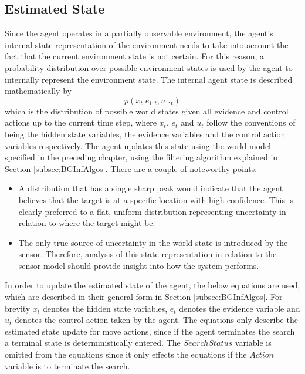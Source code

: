 \subsection{Estimated State}
\workinprogress
Since the agent operates in a partially observable environment, the agent's internal state representation of the environment needs to take into account the fact that the current environment state is not certain. For this reason, a probability distribution over possible environment states is used by the agent to internally represent the environment state. The internal agent state is described mathematically by 
\[p(x_t | e_{1:t}, u_{1:t})\]
which is the distribution of possible world states given all evidence and control actions up to the current time step, where $x_t$, $e_t$ and $u_t$ follow the conventions of being the hidden state variables, the evidence variables and the control action variables respectively. The agent updates this state using the world model specified in the preceding chapter, using the filtering algorithm explained in Section \ref{subsec:BGInfAlgos}. There are a couple of noteworthy points:
\begin{itemize}
    \item A distribution that has a single sharp peak would indicate that the agent believes that the target is at a specific location with high confidence. This is clearly preferred to a flat, uniform distribution representing uncertainty in relation to where the target might be.
    \item The only true source of uncertainty in the world state is introduced by the sensor. Therefore, analysis of this state representation in relation to the sensor model should provide insight into how the system performs.
\end{itemize}
\par In order to update the estimated state of the agent, the below equations are used, which are described in their general form in Section \ref{subsec:BGInfAlgos}. For brevity $x_t$ denotes the hidden state variables, $e_t$ denotes the evidence variable and $u_t$ denotes the control action taken by the agent. The equations only describe the estimated state update for move actions, since if the agent terminates the search a terminal state is deterministically entered. The $SearchStatus$ variable is omitted from the equations since it only effects the equations if the $Action$ variable is to terminate the search.
\scriptsize
